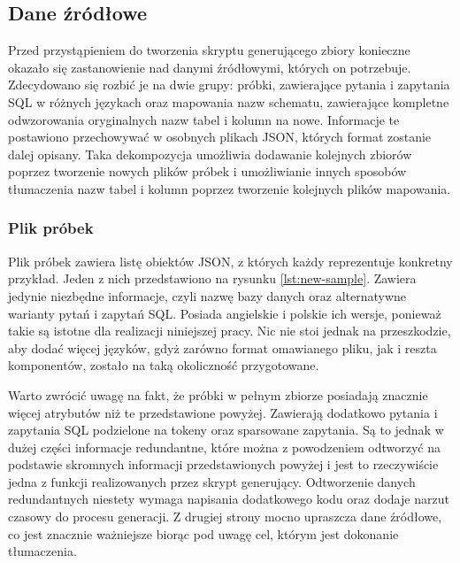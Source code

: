 \subsection{Dane źródłowe}
Przed przystąpieniem do tworzenia skryptu generującego zbiory konieczne okazało się zastanowienie nad danymi źródłowymi, których on potrzebuje. Zdecydowano się rozbić je na dwie grupy: próbki, zawierające pytania i zapytania SQL w różnych językach oraz mapowania nazw schematu, zawierające kompletne odwzorowania oryginalnych nazw tabel i kolumn na nowe. Informacje te postawiono przechowywać w osobnych plikach JSON, których format zostanie dalej opisany. Taka dekompozycja umożliwia dodawanie kolejnych zbiorów poprzez tworzenie nowych plików próbek i umożliwianie innych sposobów tłumaczenia nazw tabel i kolumn poprzez tworzenie kolejnych plików mapowania.

\subsubsection{Plik próbek}
Plik próbek zawiera listę obiektów JSON, z których każdy reprezentuje konkretny przykład. Jeden z nich przedstawiono na rysunku \ref{lst:new-sample}. Zawiera jedynie niezbędne informacje, czyli nazwę bazy danych oraz alternatywne warianty pytań i zapytań SQL. Posiada angielskie i polskie ich wersje, ponieważ takie są istotne dla realizacji niniejszej pracy. Nic nie stoi jednak na przeszkodzie, aby dodać więcej języków, gdyż zarówno format omawianego pliku, jak i reszta komponentów, zostało na taką okoliczność przygotowane.

\begin{minipage}{\linewidth}

\end{minipage}

Warto zwrócić uwagę na fakt, że próbki w pełnym zbiorze posiadają znacznie więcej atrybutów niż te przedstawione powyżej. Zawierają dodatkowo pytania i zapytania SQL podzielone na tokeny oraz sparsowane zapytania. Są to jednak w dużej części informacje redundantne, które można z powodzeniem odtworzyć na podstawie skromnych informacji przedstawionych powyżej i jest to rzeczywiście jedna z funkcji realizowanych przez skrypt generujący. Odtworzenie danych redundantnych niestety wymaga napisania dodatkowego kodu oraz dodaje narzut czasowy do procesu generacji. Z drugiej strony mocno upraszcza dane źródłowe, co jest znacznie ważniejsze biorąc pod uwagę cel, którym jest dokonanie tłumaczenia. 

